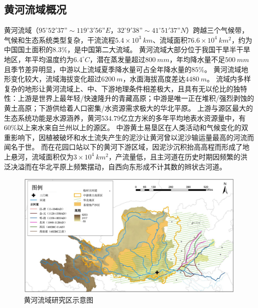 \subsection{黄河流域概况}

黄河流域（$95^{\circ}52'37” \sim 119^{\circ}3'56”E$，$32^{\circ}9'38” \sim 41^{\circ}51'37”N$）跨越三个气候带，气候和生态系统类型复杂，干流流程$5.4 \times 10^3~km$、流域面积$76.6 \times 10^4~km^2$，约为中国国土面积的$8.3\%$，是中国第二大流域。
黄河流域大部分位于我国干旱半干旱地区，年平均温度约为$6.4 ^{\circ}C$，潜在蒸发量超过$800~mm$，年均降水量不足$500~mm$且季节差异明显，中游以上流域夏季降水量可占全年降水量的$85\%$\cite{maxuening2012,wang2007}。
黄河流域地形变化较大，流域海拔变化超过$6200~m$，水面海拔高度差达$4480~m$。
流域内多样复杂的地形让黄河流域上、中、下游地理条件相差极大，且具有无以伦比的独特性：上游是世界上最年轻/快速隆升的青藏高原；中游是唯一正在堆积/强烈剥蚀的黄土高原；下游供给着人口密集/水资源需求极大的华北平原。
上游与源区最大的生态系统功能是水源涵养，黄河$534.79$亿立方米的多年平均地表水资源量中，有$60\%$以上来水来自兰州以上的源区\cite{huchunhong2018}。
中游黄土易垦区在人类活动和气候变化的双重影响下，因植被破坏和水土流失产生的泥沙让黄河曾以泥沙输运量最高的河流而闻名于世\cite{best2019}。
而在花园口站以下的黄河下游区域，因泥沙沉积抬高高程而形成了地上悬河，流域面积仅为$3 \times 10^4~km^2$，产流量低，且主河道在历史时期因频繁的洪泛决溢而在华北平原上频繁摆动，自西向东形成不计其数的辫状古河道。


\begin{figure}[htb] %
    \includegraphics[width=\textwidth]{img/ch1/ch1_study_area.png}
    \caption{黄河流域研究区示意图}\label{ch1:fig:study_area}
\end{figure}

